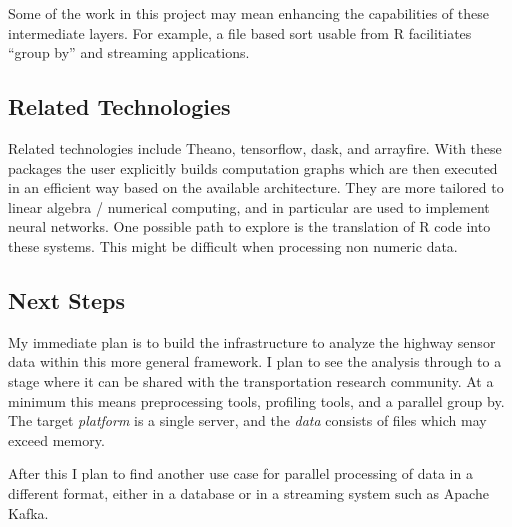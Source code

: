 \documentclass[12pt]{article}
\begin{document}
Some of the work in this project may mean enhancing the capabilities of these
intermediate layers. For example, a file based sort usable from R facilitiates
``group by'' and streaming applications.

\subsection{Related Technologies}

Related technologies include Theano, tensorflow, dask, and arrayfire. With
these packages the user explicitly builds computation graphs which are then
executed in an efficient way based on the available architecture. They are
more tailored to linear algebra / numerical computing, and in particular
are used to implement neural networks. One possible path to explore is the
translation of R code into these systems. This might be difficult when
processing non numeric data.

\subsection{Next Steps}

My immediate plan is to build the infrastructure to analyze the highway
sensor data within this more general framework. I plan to see the analysis
through to a stage where it can be shared with the transportation research
community.  At a minimum this means preprocessing tools, profiling tools,
and a parallel group by. The target \emph{platform} is a single server, and
the \emph{data} consists of files which may exceed memory.

After this I plan to find another use case for parallel processing of data
in a different format, either in a database or in a streaming system such
as Apache Kafka.


 
\end{document}
